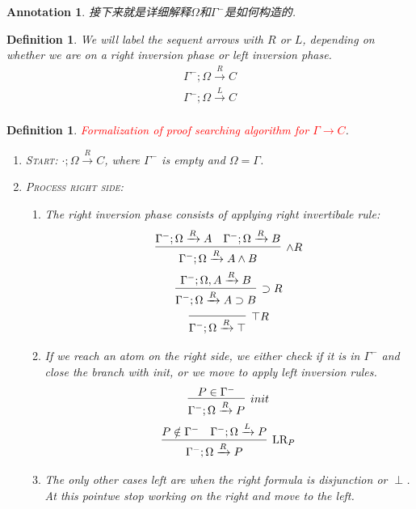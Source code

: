 \documentclass{article}
\theoremstyle{plain}
\newtheorem{definition}[theorem]{Definition}
\newtheorem{annotation}[theorem]{Annotation}
\theoremstyle{nonumberplain}
\newcommand{\redt}[1]{\textcolor{red}{#1}}
\begin{document}
\begin{annotation}
\rm 接下来就是详细解释$\Omega$和$\Gamma^-$是如何构造的.
\end{annotation}

\begin{definition}
\rm We will label the sequent arrows with $R$ or $L$, depending on whether we are on a right inversion phase or left inversion phase.
$$
\begin{gathered}
\Gamma^-;\Omega \xrightarrow{R} C \\
\Gamma^-;\Omega \xrightarrow{L} C \\
\end{gathered}
$$
\end{definition}


\begin{definition}
\rm \redt{Formalization of proof searching algorithm for $\Gamma \to C$}.
\begin{enumerate}
	\item \textsc{Start}: $\cdot;\Omega \xrightarrow{R} C$, where $\Gamma^-$ is empty and $\Omega = \Gamma$. 
	\item \textsc{Process right side}: 
	\begin{enumerate}
		\item The right inversion phase consists of applying right invertibale rule:
	$$
	\begin{gathered}
	\infer[\wedge R]{\Gamma^-; \Omega \xrightarrow{R} A \wedge B}{\Gamma^-; \Omega \xrightarrow{R} A & \Gamma^-; \Omega \xrightarrow{R} B} \\
	\infer[\supset R]{\Gamma^-; \Omega \xrightarrow{R} A \supset B}{\Gamma^-; \Omega, A \xrightarrow{R} B} \\
	\infer[\top R]{\Gamma^-; \Omega \xrightarrow{R} \top}{}
	\end{gathered}
	$$
		\item If we reach an atom on the right side, we either check if it is in $\Gamma^-$ and close the branch with \emph{init}, or we move to apply left inversion rules.
		$$
		\begin{gathered}
		\infer[init]{\Gamma^-; \Omega \xrightarrow{R} P}{P \in \Gamma^-} \\
		\infer[\text{LR}_P]{\Gamma^-; \Omega \xrightarrow{R} P}{P \notin \Gamma^- & \Gamma^-; \Omega \xrightarrow{L} P}
		\end{gathered}
		$$
		\item The only other cases left are when the right formula is disjunction or $\perp$. At this pointwe stop working on the right and move to the left.

\end{enumerate}
\end{enumerate}
\end{definition}
\end{document}
